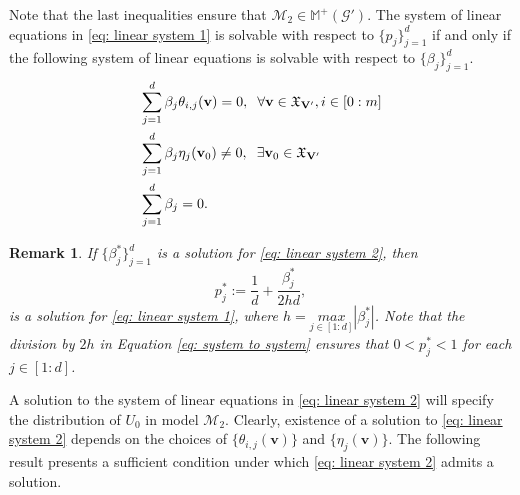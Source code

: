 \documentclass[accepted]{uai2022}
\newtheorem{remark}{Remark}
\newcommand{\V}[0]{\mathbf{V}}
\newcommand{\G}[0]{\mathcal{G}}
\newcommand{\M}[0]{\mathcal{M}}
\newcommand{\dom}[1]{\mathfrak{X}_{#1}}
\begin{document}
    Note that the last inequalities ensure that $\M_2 \in \mathbb{M^+(\G')}$.
    The system of linear equations in \eqref{eq: linear system 1} is solvable with respect to  $\{p_j\}_{j=1}^d$ if and only if the following system of linear equations is solvable with respect to $\{\beta_j\}_{j=1}^d$.
    \begin{equation} \label{eq: linear system 2}
    \begin{split}
        &\sum_{j=1}^d \beta_j \theta_{i,j}(\mathbf{v}) =0, \hspace{0.2cm}\forall \mathbf{v} \in \dom{\V'}, i \in [0:m]\\
        &\sum_{j=1}^d \beta_j \eta_j(\mathbf{v}_0) \neq 0, \hspace{0.2cm} \exists \mathbf{v}_0 \in \dom{\V'}\\
        & \sum_{j=1}^d \beta_j=0.
    \end{split}
    \end{equation}
    
    \begin{remark}
        If $\{\beta_j^*\}_{j=1}^d$ is a solution for \eqref{eq: linear system 2}, then
        \begin{equation} \label{eq: system to system}
            p_j^* := \frac{1}{d} + \frac{\beta^*_j}{2h d},
        \end{equation}
        is a solution for \eqref{eq: linear system 1}, where $h = \underset{j \in [1:d]}{max} |\beta^*_j|$. 
        Note that the division by $2h$ in Equation \eqref{eq: system to system} ensures that $0< p_j^* <1$ for each $j \in [1:d]$.
    \end{remark}
    A solution to the system of linear equations in \eqref{eq: linear system 2} will specify the distribution of $U_0$ in model $\M_2$. Clearly, existence of a solution to \eqref{eq: linear system 2} depends on the choices of $\{\theta_{i,j}(\mathbf{v})\}$ and $\{\eta_j(\mathbf{v})\}$. 
    The following result presents a sufficient condition under which \eqref{eq: linear system 2} admits a solution.
    
\end{document}
